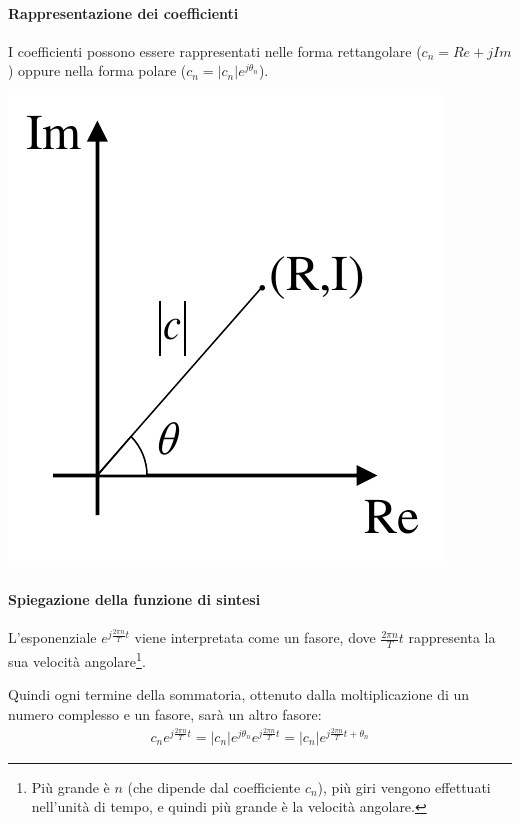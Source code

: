 \documentclass[a4paper, 10pt]{report}
\begin{document}
\paragraph*{Rappresentazione dei coefficienti} I coefficienti possono essere rappresentati nelle forma rettangolare ($c_n = Re + jIm$) oppure nella forma polare ($c_n = |c_n|e^{j\theta_n}$).
\begin{center}
\includegraphics[scale=0.65]{1.pdf}
\end{center}

\paragraph*{Spiegazione della funzione di sintesi} L'esponenziale $e^{j\frac{2 \pi n}{T} t}$ viene interpretata come un fasore, dove $\frac{2 \pi n}{T} t$ rappresenta la sua velocità angolare\footnote{Più grande è $n$ (che dipende dal coefficiente $c_n$), più giri vengono effettuati nell'unità di tempo, e quindi più grande è la velocità angolare.}. 

\noindent Quindi ogni termine della sommatoria, ottenuto dalla moltiplicazione di un numero complesso e un fasore, sarà un altro fasore:
\begin{align*}
c_ne^{j\frac{2 \pi n}{T} t} = |c_n|e^{j\theta_n}e^{j\frac{2 \pi n}{T} t} = |c_n|e^{j\frac{2 \pi n}{T} t + \theta_n}
\end{align*}
\end{document}
